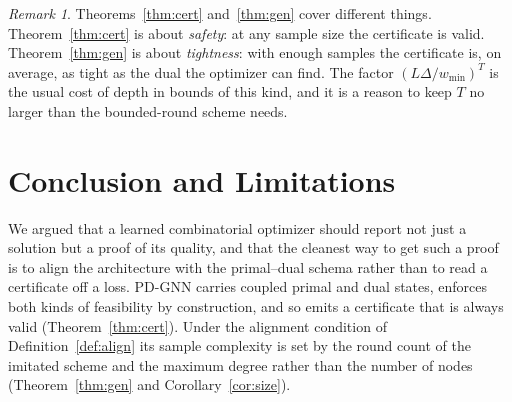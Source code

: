 \documentclass[11pt]{article}
\theoremstyle{plain}
\theoremstyle{definition}
\theoremstyle{remark}
\newtheorem{remark}{Remark}
\newcommand{\PDGNN}{\textsc{PD-GNN}}
\begin{document}
\begin{remark}\label{rem:two}
Theorems~\ref{thm:cert} and~\ref{thm:gen} cover different things.
Theorem~\ref{thm:cert} is about \emph{safety}: at any sample size the
certificate is valid. Theorem~\ref{thm:gen} is about \emph{tightness}: with
enough samples the certificate is, on average, as tight as the dual the
optimizer can find. The factor $(L\Delta/w_{\min})^T$ is the usual cost of depth in bounds
of this kind, and it is a reason to keep $T$ no larger than the bounded-round
scheme needs.
\end{remark}



\section{Conclusion and Limitations}\label{sec:conc}
We argued that a learned combinatorial optimizer should report not just a
solution but a proof of its quality, and that the cleanest way to get such a
proof is to align the architecture with the primal--dual schema rather than to
read a certificate off a loss. \PDGNN{} carries coupled primal and dual states,
enforces both kinds of feasibility by construction, and so emits a certificate
that is always valid (Theorem~\ref{thm:cert}). Under the alignment condition of
Definition~\ref{def:align} its sample complexity is set by the round count of the
imitated scheme and the maximum degree rather than the number of nodes
(Theorem~\ref{thm:gen} and Corollary~\ref{cor:size}).
\end{document}
